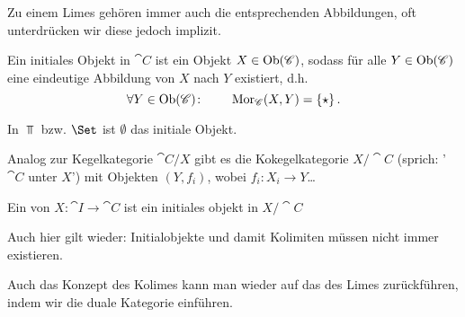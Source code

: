 \begin{oral}
    Zu einem Limes gehören immer auch die entsprechenden Abbildungen, oft unterdrücken wir diese jedoch implizit.
\end{oral}

\begin{definition}\label{def:initiales-objekt}
    Ein initiales Objekt in $\cat{C}$ ist ein Objekt $X\in \operatorname{Ob}(\mathscr{C})$, sodass für alle $Y\in \operatorname{Ob}(\mathscr{C})$ eine eindeutige Abbildung von $X$ nach  $Y$ existiert, d.h.
     \[
         \forall Y\in \operatorname{Ob}(\mathscr{C})\colon  \qquad \operatorname{Mor}_{\mathscr{C}}(X,Y) = \left \{\star\right\} 
    .\] 
\end{definition}

\begin{example}
    In $\Top$ bzw.  $\Set$ ist  $\emptyset$ das initiale Objekt.
\end{example}

\begin{definition}[Kokegelkategorie]\label{def:kokegelkategorie}
    Analog zur Kegelkategorie $\cat{C} / X$ gibt es die Kokegelkategorie $X / \cat{C}$ (sprich: '$\cat{C}$ unter $X$') mit Objekten  $(Y, f_i)$, wobei  $f_i \colon  X_i \to  Y$\ldots
\end{definition}

\begin{definition}[Kolimes]\label{def:kolimes}
    Ein  von $X\colon \cat{I} \to  \cat{C}$ ist ein initiales objekt in $X / \cat{C}$ 
\end{definition}

\begin{warning}
    Auch hier gilt wieder: Initialobjekte und damit Kolimiten müssen nicht immer existieren.
\end{warning}

\begin{oral}
    Auch das Konzept des Kolimes kann man wieder auf das des Limes zurückführen, indem wir die duale Kategorie einführen.
\end{oral}

